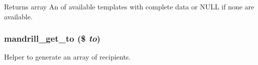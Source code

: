 \begin{DoxyReturn}{Returns}
array An of available templates with complete data or NULL if none are available. 
\end{DoxyReturn}
\hypertarget{mandrill_8module_ac4fe15812a9e519069233d0493339caf}{
\subsubsection[{mandrill\_\-get\_\-to}]{\setlength{\rightskip}{0pt plus 5cm}mandrill\_\-get\_\-to (\$ {\em to})}}
\label{mandrill_8module_ac4fe15812a9e519069233d0493339caf}
Helper to generate an array of recipients.


